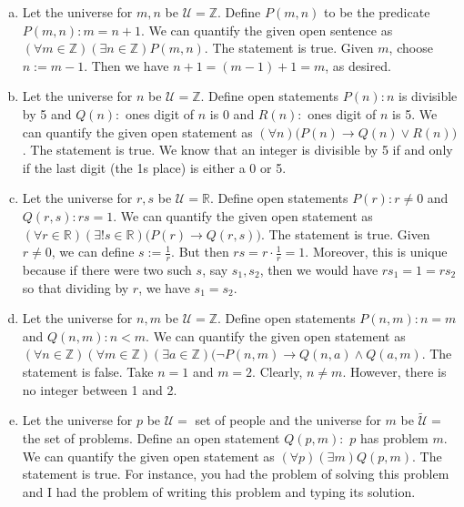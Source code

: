 \documentclass[11pt,letterpaper]{article}
\begin{document}
\sol 
\begin{enumerate}[(a)]
\item Let the universe for $m, n$ be $\mathcal{U}= \mathbb{Z}$. Define $P(m, n)$ to be the predicate $P(m, n): m= n + 1$. We can quantify the given open sentence as $(\forall m \in \mathbb{Z})(\exists n \in \mathbb{Z}) P(m, n)$. The statement is true. Given $m$, choose $n:= m - 1$. Then we have $n + 1= (m - 1) + 1= m$, as desired. \pspace

\item Let the universe for $n$ be $\mathcal{U}= \mathbb{Z}$. Define open statements $P(n): n$ is divisible by 5 and $Q(n):$ ones digit of $n$ is 0 and $R(n):$ ones digit of $n$ is 5. We can quantify the given open statement as $(\forall n) \big( P(n) \to Q(n) \vee R(n) \big)$. The statement is true. We know that an integer is divisible by 5 if and only if the last digit (the 1s place) is either a 0 or 5. \pspace

\item Let the universe for $r, s$ be $\mathcal{U}= \mathbb{R}$. Define open statements $P(r): r \neq 0$ and $Q(r, s): rs= 1$. We can quantify the given open statement as $(\forall r \in \mathbb{R})(\exists! s \in \mathbb{R}) \big( P(r) \to Q(r, s) \big)$. The statement is true. Given $r \neq 0$, we can define $s:= \frac{1}{r}$. But then $rs= r \cdot \frac{1}{r}= 1$. Moreover, this is unique because if there were two such $s$, say $s_1, s_2$, then we would have $rs_1= 1= rs_2$ so that dividing by $r$, we have $s_1= s_2$. \pspace

\item Let the universe for $n, m$ be $\mathcal{U}= \mathbb{Z}$. Define open statements $P(n, m): n= m$ and $Q(n, m): n < m$. We can quantify the given open statement as $(\forall n \in \mathbb{Z})(\forall m \in \mathbb{Z})(\exists a \in \mathbb{Z}) \big( \neg P(n, m) \to Q(n, a) \wedge Q(a, m)$. The statement is false. Take $n= 1$ and $m= 2$. Clearly, $n \neq m$. However, there is no integer between 1 and 2. \pspace

\item Let the universe for $p$ be $\mathcal{U}=$ set of people and the universe for $m$ be $\widetilde{\mathcal{U}}=$ the set of problems. Define an open statement $Q(p, m):$ $p$ has problem $m$. We can quantify the given open statement as $(\forall p)(\exists m) Q(p, m)$. The statement is true. For instance, you had the problem of solving this problem and I had the problem of writing this problem and typing its solution. 
\end{enumerate}
\end{document}
